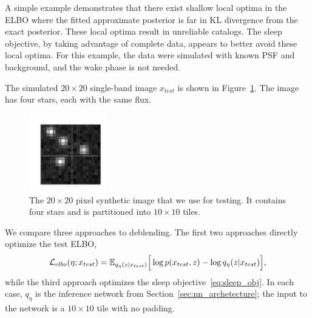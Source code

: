 

\label{sec:elbo_sleep_compare}

A simple example demonstrates that there exist shallow local optima in the ELBO
where the fitted approximate posterior is far in KL divergence from the exact posterior. 
These local optima result in unreliable catalogs. 
The sleep objective, by taking advantage of  complete data, appears to better avoid these local optima. 
For this example, the data were simulated with known PSF and background, and the wake phase is not needed. 

The simulated $20\times20$ single-band image $x_{test}$ is shown in Figure~\ref{fig:toy_example}.
The image has four stars, each with the same flux. 

\begin{figure}[!h]
    \centering
    \vspace{-1em}
    \includegraphics[width = 0.3\textwidth]{figures/vi_sleep_ex_figure.png}
    \vspace{-1.7em}
    \caption{The $20\times 20$ pixel synthetic image that we use for testing. It contains four stars and is partitioned into $10\times 10$ tiles. }
    \label{fig:toy_example}
\end{figure}

We compare three approaches to deblending. The first two approaches directly optimize the test ELBO, 
\begin{align}
\mathcal{L}_{elbo}(\eta; x_{test}) = \mathbb{E}_{q_{\eta}(z | x_{test})}\Big[\log p(x_{test}, z) - \log q_{\eta}(z | x_{test})\Big],
\label{eq:elbo_on_test}
\end{align}
while the third approach optimizes the sleep objective~\eqref{eq:sleep_obj}. 
In each case, $q_\eta$ is the inference network from Section~\ref{sec:nn_archetecture}; the input to the network is a $10\times 10$ tile with no padding. 

